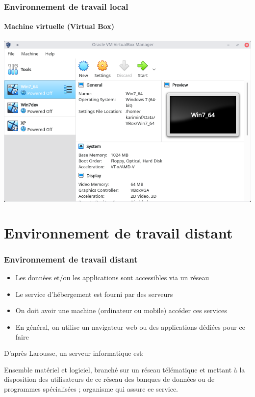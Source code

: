 \documentclass{beamer}
\begin{document}
\begin{frame}
\frametitle{Environnement de travail local}
\framesubtitle{Machine virtuelle (Virtual Box)}

\begin{center}
	\includegraphics[height=
.8\textheight]{../img/Bweb01-environnement/vbox.png}
\end{center}

\end{frame}


\section{Environnement de travail distant}

\begin{frame}
\frametitle{Environnement de travail distant}

\begin{itemize}
	\item Les données et/ou les applications sont accessibles via un réseau
	\item Le service d'hébergement est fourni par des serveurs
	\item On doit avoir une machine (ordinateur ou mobile) accéder ces services
	\item En général, on utilise un navigateur web ou des applications dédiées pour ce faire
\end{itemize}

D'après Larousse, un serveur informatique est:
\begin{definition}
	Ensemble matériel et logiciel, branché sur un réseau télématique et mettant à la disposition des utilisateurs de ce réseau des banques de données ou de programmes spécialisées ; organisme qui assure ce service.
\end{definition}

\end{frame}
\end{document}
